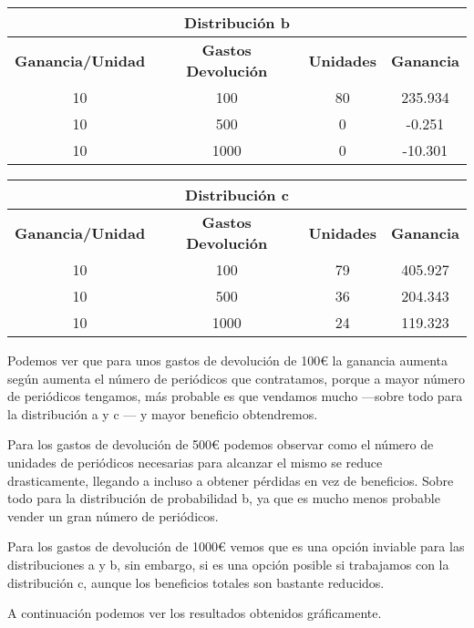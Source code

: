 \begin{table}[H]
\centering
\begin{tabular}{|c|c|c|c|}
\hline
\multicolumn{4}{|c|}{\textbf{Distribución b}} \\ \hline
\textbf{Ganancia/Unidad} & \textbf{Gastos Devolución} & \textbf{Unidades} & \textbf{Ganancia} \\ \hline
10 & 100 & 80 & 235.934 \\
10 & 500 & 0 & -0.251 \\
10 & 1000 & 0 & -10.301 \\ \hline
\end{tabular}
\end{table}

\begin{table}[H]
\centering
\begin{tabular}{|c|c|c|c|}
\hline
\multicolumn{4}{|c|}{\textbf{Distribución c}} \\ \hline
\textbf{Ganancia/Unidad} & \textbf{Gastos Devolución} & \textbf{Unidades} & \textbf{Ganancia} \\ \hline
10 & 100 & 79 & 405.927 \\
10 & 500 & 36 & 204.343 \\
10 & 1000 & 24 & 119.323 \\ \hline
\end{tabular}
\end{table}

Podemos ver que para unos gastos de devolución de 100€ la ganancia aumenta según aumenta el número de periódicos que contratamos, porque a mayor número de periódicos tengamos, más probable es que vendamos mucho ---sobre todo para la distribución a y c --- y mayor beneficio obtendremos.

Para los gastos de devolución de 500€ podemos observar como el número de unidades de periódicos necesarias para alcanzar el mismo se reduce drasticamente, llegando a incluso a obtener pérdidas en vez de beneficios. Sobre todo para la distribución de probabilidad b, ya que es mucho menos probable vender un gran número de periódicos.

Para los gastos de devolución de 1000€ vemos que es una opción inviable para las distribuciones a y b, sin embargo, si es una opción posible si trabajamos con la distribución c, aunque los beneficios totales son bastante reducidos.

\newpage

A continuación podemos ver los resultados obtenidos gráficamente.

